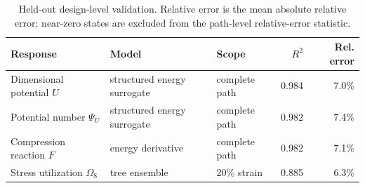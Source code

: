\begin{table}[t]
\centering\small
\caption{Held-out design-level validation. Relative error is the mean absolute relative error; near-zero states are excluded from the path-level relative-error statistic.}
\label{tab:physics_validation}
\begin{tabular}{lllrr}
\toprule
Response & Model & Scope & $R^2$ & Rel. error \\
\midrule
Dimensional potential $U$ & structured energy surrogate & complete path & 0.984 & 7.0\% \\
Potential number $\Psi_U$ & structured energy surrogate & complete path & 0.982 & 7.4\% \\
Compression reaction $F$ & energy derivative & complete path & 0.982 & 7.1\% \\
Stress utilization $\Omega_8$ & tree ensemble & 20\% strain & 0.885 & 6.3\% \\
\bottomrule
\end{tabular}
\end{table}
